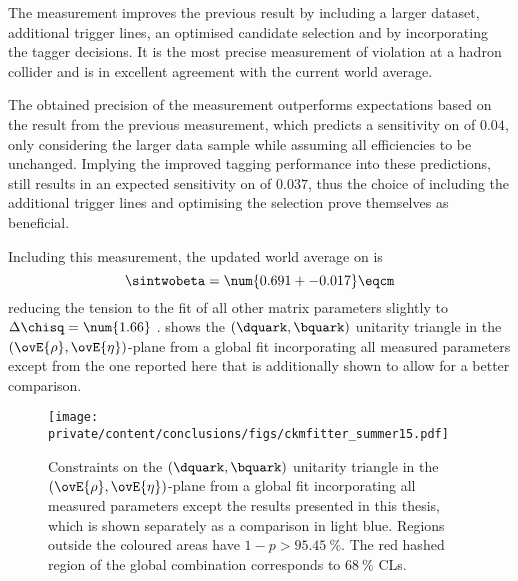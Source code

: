 The measurement improves the previous \LHCb result \cite{Aaij:1497268} by
including a larger dataset, additional trigger lines, an optimised candidate
selection and by incorporating the \SSpi tagger decisions. It is the most
precise measurement of \CP violation at a hadron collider and is in excellent
agreement with the current world average.

The obtained precision of the measurement outperforms expectations based on
the result from the previous measurement, which predicts a sensitivity on
\SJpsiKS of $\num{0.04}$, only considering the larger data sample while assuming
all efficiencies to be unchanged. Implying the improved tagging performance
into these predictions, still results in an expected sensitivity on \SJpsiKS of
$\num{0.037}$, thus the choice of including the additional trigger lines and
optimising the selection prove themselves as beneficial.

Including this measurement, the updated world average on \sintwobeta
\cite{Amhis:2014hma} is
%
\begin{equation*}
  \sintwobeta = \num{0.691 +- 0.017} \eqcm
\end{equation*}
%
reducing the tension to the fit of all other \CKM matrix parameters slightly to
$\Delta\chisq = \num{1.66}$ \cite{Charles:2004jd}. 
 shows the ${(\dquark,\bquark)}$ unitarity
triangle in the ${(\ovE{\rho},\ovE{\eta})}$-plane from a global fit
incorporating all measured \CKM parameters \cite{Charles:2004jd} except from the
one reported here that is additionally shown to allow for a better comparison.
%
\begin{figure}[ht]
\centering
\texttt{[image: private/content/conclusions/figs/ckmfitter\_summer15.pdf]}
\caption{Constraints on the ${(\dquark,\bquark)}$ unitarity triangle in the
${(\ovE{\rho},\ovE{\eta})}$-plane from a global fit incorporating all measured
\CKM parameters except the results presented in this thesis, which is shown
separately as a comparison in light blue. Regions outside the coloured areas
have $1-p > \SI{95.45}{\percent}$. The red hashed region of the global
combination corresponds to $\SI{68}{\percent}$ \acp{CL}. \cite{Charles:2004jd}}
\label{fig:conclusion:ckm_fitter_15}
\end{figure}

